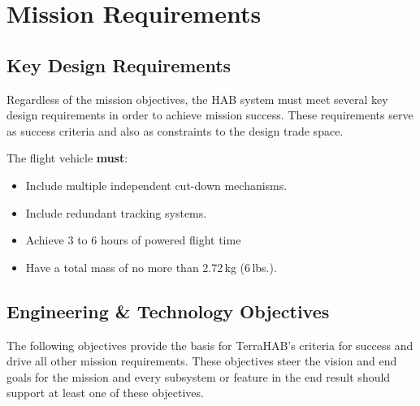 \section{Mission Requirements}
\subsection{Key Design Requirements}
Regardless of the mission objectives, the HAB system must meet several key 
design requirements in order to achieve mission success. These requirements
serve as success criteria and also as constraints to the design trade space.

The flight vehicle \textbf{must}:
\begin{itemize}
    \item Include multiple independent cut-down mechanisms.
    \item Include redundant tracking systems.
    \item Achieve 3 to 6 hours of powered flight time
    \item Have a total mass of no more than 2.72\,kg (6\,lbs.).
\end{itemize}

\subsection{Engineering \& Technology Objectives}
\label{mission-reqs:eng-objectives}
The following objectives provide the basis for TerraHAB's criteria for success
and drive all other mission requirements. These objectives steer the vision
and end goals for the mission and every subsystem or feature in the end result 
should support at least one of these objectives.

